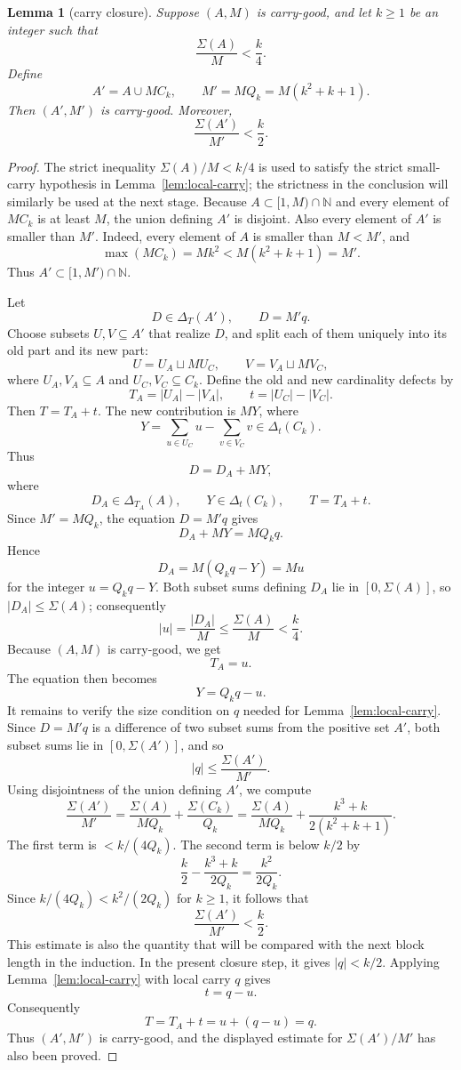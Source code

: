 \documentclass[11pt]{article}
\newtheorem{lemma}{Lemma}
\newcommand{\N}{\mathbb{N}}
\newcommand{\D}{\Delta}
\newcommand{\Sig}{\Sigma}
\begin{document}
\begin{lemma}[carry closure]\label{lem:closure}
Suppose $(A,M)$ is carry-good, and let $k\ge1$ be an integer such that
\[
        \frac{\Sig(A)}M<\frac k4.
\]
Define
\[
        A'=A\cup M C_k,
        \qquad
        M'=M Q_k=M(k^2+k+1).
\]
Then $(A',M')$ is carry-good.  Moreover,
\[
        \frac{\Sig(A')}{M'}<\frac k2.
\]
\end{lemma}

\begin{proof}
The strict inequality $\Sig(A)/M<k/4$ is used to satisfy the strict small-carry hypothesis in Lemma~\ref{lem:local-carry}; the strictness in the conclusion will similarly be used at the next stage.  Because $A\subset[1,M)\cap\N$ and every element of $MC_k$ is at least $M$, the union defining $A'$ is disjoint.  Also every element of $A'$ is smaller than $M'$.  Indeed, every element of $A$ is smaller than $M<M'$, and
\[
        \max(MC_k)=Mk^2<M(k^2+k+1)=M'.
\]
Thus $A'\subset[1,M')\cap\N$.

Let
\[
        D\in\D_T(A'),
        \qquad
        D=M'q.
\]
Choose subsets $U,V\subseteq A'$ that realize $D$, and split each of them uniquely into its old part and its new part:
\[
        U=U_A\sqcup MU_C,
        \qquad
        V=V_A\sqcup MV_C,
\]
where $U_A,V_A\subseteq A$ and $U_C,V_C\subseteq C_k$.  Define the old and new cardinality defects by
\[
        T_A=|U_A|-|V_A|,
        \qquad
        t=|U_C|-|V_C|.
\]
Then $T=T_A+t$.  The new contribution is $MY$, where
\[
        Y=\sum_{u\in U_C}u-\sum_{v\in V_C}v\in\D_t(C_k).
\]
Thus
\[
        D=D_A+MY,
\]
where
\[
        D_A\in \D_{T_A}(A),
        \qquad
        Y\in \D_t(C_k),
        \qquad
        T=T_A+t.
\]
Since $M'=M Q_k$, the equation $D=M'q$ gives
\[
        D_A+MY=M Q_k q.
\]
Hence
\[
        D_A=M(Q_k q-Y)=Mu
\]
for the integer $u=Q_k q-Y$.  Both subset sums defining $D_A$ lie in $[0,\Sig(A)]$, so $|D_A|\le \Sig(A)$; consequently
\[
        |u|=\frac{|D_A|}{M}\le \frac{\Sig(A)}M<\frac k4.
\]
Because $(A,M)$ is carry-good, we get
\[
        T_A=u.
\]
The equation then becomes
\[
        Y=Q_k q-u.
\]
It remains to verify the size condition on $q$ needed for Lemma~\ref{lem:local-carry}.  Since $D=M'q$ is a difference of two subset sums from the positive set $A'$, both subset sums lie in $[0,\Sig(A')]$, and so
\[
        |q|\le \frac{\Sig(A')}{M'}.
\]
Using disjointness of the union defining $A'$, we compute
\[
\frac{\Sig(A')}{M'}
=
\frac{\Sig(A)}{M Q_k}+\frac{\Sig(C_k)}{Q_k}
=
\frac{\Sig(A)}{M Q_k}+\frac{k^3+k}{2(k^2+k+1)}.
\]
The first term is $<k/(4Q_k)$.  The second term is below $k/2$ by
\[
        \frac{k}{2}-\frac{k^3+k}{2Q_k}=\frac{k^2}{2Q_k}.
\]
Since $k/(4Q_k)<k^2/(2Q_k)$ for $k\ge1$, it follows that
\[
        \frac{\Sig(A')}{M'}<\frac k2.
\]
This estimate is also the quantity that will be compared with the next block length in the induction.  In the present closure step, it gives $|q|<k/2$.  Applying Lemma~\ref{lem:local-carry} with local carry $q$ gives
\[
        t=q-u.
\]
Consequently
\[
        T=T_A+t=u+(q-u)=q.
\]
Thus $(A',M')$ is carry-good, and the displayed estimate for $\Sig(A')/M'$ has also been proved.
\end{proof}
\end{document}
